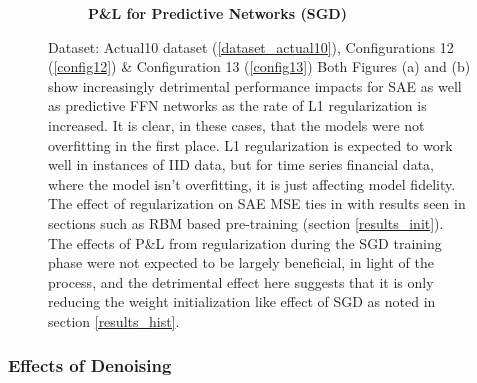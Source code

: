 \documentclass[a4paper,11pt,oneside]{article}
\theoremstyle{plain}
\theoremstyle{definition}
\begin{document}
\begin{figure}[H]
\begin{subfigure}{.5\textwidth}
			\caption{\textbf{P\&L for Predictive Networks (SGD)} 
				\newline }
			\label{figure-actual_pl_reg}
		\end{subfigure}
		\caption[Effects of L1 Regularization (Actual Data)]{Dataset: Actual10 dataset (\ref{dataset_actual10}),  Configurations 12 (\ref{config12}) \& Configuration 13 (\ref{config13})
			\newline Both Figures (a) and (b) show increasingly detrimental performance impacts for SAE as well as predictive FFN networks as the rate of L1 regularization is increased. It is clear, in these cases, that the models were not overfitting in the first place. L1 regularization is expected to work well in instances of IID data, but for time series financial data, where the model isn't overfitting, it is just affecting model fidelity. The effect of regularization on SAE MSE ties in with results seen in sections such as RBM based pre-training (section \ref{results_init}). The effects of P\&L from regularization during the SGD training phase were not expected to be largely beneficial, in light of the process, and the detrimental effect here suggests that it is only reducing the weight initialization like effect of SGD as noted in section \ref{results_hist}.}
		\label{figure-results-reg}
	\end{figure}
	
	\subsubsection{Effects of Denoising}
	
\end{document}
